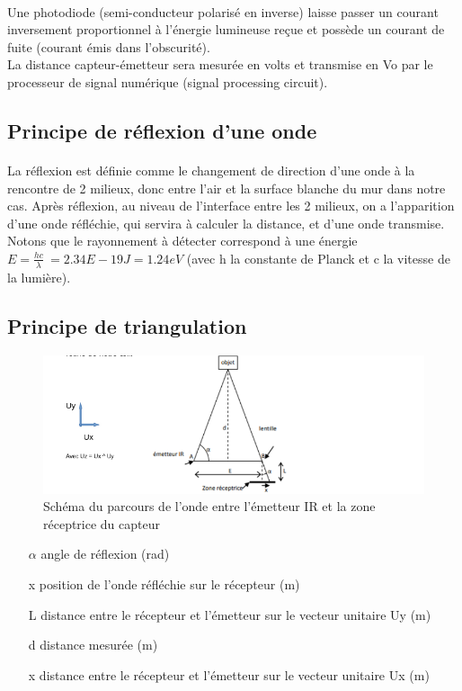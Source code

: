 \documentclass[oneside,a4paper,12pt]{article}
\begin{document}
	\paragraph{}
	Une photodiode (semi-conducteur polarisé en inverse) laisse passer un courant inversement proportionnel à l’énergie lumineuse reçue et possède un courant de fuite (courant émis dans l’obscurité).\\
	La distance capteur-émetteur sera mesurée en volts et transmise en Vo par le processeur de signal numérique (signal processing circuit).
	\subsection{Principe de réflexion d’une onde}
	\paragraph{}
	La réflexion est définie comme le changement de direction d’une onde à la rencontre de 2 milieux, donc entre l’air et la surface blanche du mur dans notre cas. Après réflexion, au niveau de l’interface entre les 2 milieux, on a l’apparition d’une onde réfléchie, qui servira à calculer la distance, et d’une onde transmise.\\
	
	Notons que le rayonnement à détecter correspond à une énergie $ E= \frac{hc}{\lambda} \ = 2.34 E-19 J = 1.24 eV $  (avec h la constante de Planck et c la vitesse de la lumière).
	
	\subsection{Principe de triangulation}
	
	\begin{figure}[h]
		\centering
		\includegraphics[width=12cm]{img4.png}
		\caption{Schéma du parcours de l’onde entre l'émetteur IR et la zone réceptrice du capteur}
	\end{figure} 

	\begin{itemize}
		\item[$\alpha$] angle de réflexion (rad)
		\item[x] position de l’onde réfléchie sur le récepteur (m)
		\item[L] distance entre le récepteur et l'émetteur sur le vecteur unitaire Uy (m)
		\item[d] distance mesurée (m)
		\item[x] distance entre le récepteur et l'émetteur sur le vecteur unitaire  Ux (m)
	\end{itemize}
\end{document}

